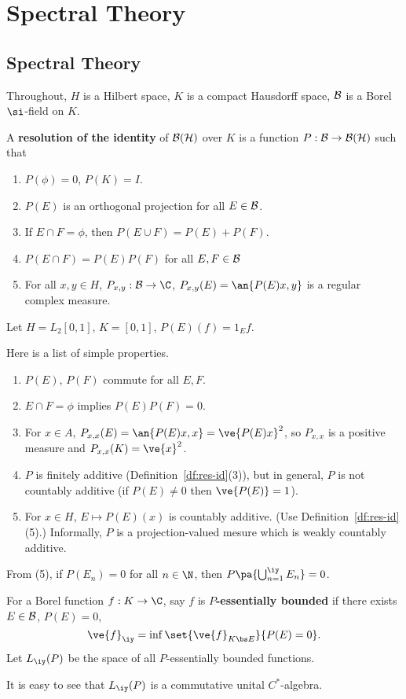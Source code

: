 \chapter{Spectral Theory}
\section{Spectral Theory}
Throughout, $H$ is a Hilbert space, $K$ is a compact Hausdorff space, $\cal B$ is a Borel $\si$-field on $K$. 
\begin{df}
A \textbf{resolution of the identity} of $\cal B(H)$ over $K$ is a function $P:\cal B\to \cal B(H)$ such that
\begin{enumerate}
\item
$P(\phi)=0$, $P(K)=I$.
\item
$P(E)$ is an orthogonal projection for all $E\in \cal B$. 
\item
If $E\cap F=\phi$, then $P(E\cup F)=P(E)+P(F)$. 
\item
$P(E\cap F)=P(E)P(F)$ for all $E,F\in \cal B$
\item
For all $x,y\in H$, $P_{x,y}:\cal B\to \C$, $P_{x,y}(E)=\an{P(E)x,y}$ is a regular complex measure.
\end{enumerate}
\end{df}
\begin{ex}
Let $H=L_2[0,1]$, $K=[0,1]$, $P(E)(f)=1_Ef$.
\end{ex}
Here is a list of simple properties.
\begin{pr}
\begin{enumerate}
\item
$P(E)$, $P(F)$ commute for all $E,F$. 
\item
$E\cap F=\phi$ implies $P(E)P(F)=0$.
\item
For $x\in A$, $P_{x,x}(E)=\an{P(E)x,x}=\ve{P(E)x}^2$, so $P_{x,x}$ is a positive measure and $P_{x,x}(K)=\ve{x}^2$. 
\item
$P$ is finitely additive (Definition~\ref{df:res-id}(3)), but in general, $P$ is not countably additive (if $P(E)\ne 0$ then $\ve{P(E)}=1$). 
\item
For $x\in H$, $E\mapsto P(E)(x)$ is countably additive. (Use Definition~\ref{df:res-id}(5).) Informally, $P$ is a projection-valued mesure which is weakly countably additive.
\end{enumerate}
\end{pr}
From (5), if $P(E_n)=0$ for all $n\in \N$,  then $P\pa{\bigcup_{n=1}^{\iy} E_n}=0$. 
\begin{df}
For a Borel function $f:K\to \C$, say $f$ is \textbf{$P$-essentially bounded} if there exists $E\in \cal B$, $P(E)=0$, 
\[
\ve{f}_{\iy}=\inf\set{\ve{f}_{K\bs E}}{P(E)=0}.
\]
Let $L_{\iy}(P)$ be the space of all $P$-essentially bounded functions.
\end{df}
It is easy to see that $L_{\iy}(P)$ is a commutative unital $C^*$-algebra.

